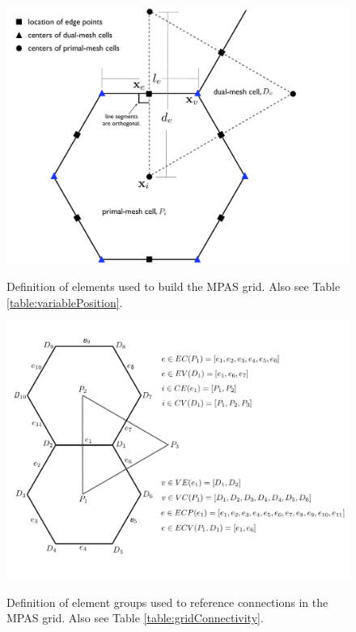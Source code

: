 %
\begin{figure}[t]
  \noindent\includegraphics[width=16cm,angle=0]{./shared_figures/variablePosition.pdf}\\
  \caption{Definition of elements used to build the MPAS grid. Also see Table \ref{table:variablePosition}.}
  \label{figure:variablePosition}
\end{figure}

%
\begin{figure}[t]
   \noindent\includegraphics[width=16cm,angle=0]{./shared_figures/gridConnectivity.pdf}\\
  \caption{Definition of element groups used to reference connections in the MPAS grid. Also see Table \ref{table:gridConnectivity}.}
  \label{figure:gridConnectivity}
\end{figure}


